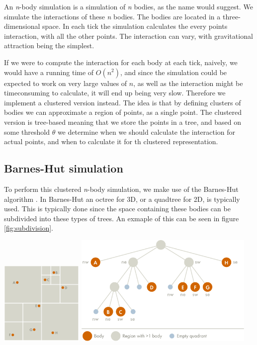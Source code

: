 An \textit{n}-body simulation is a simulation of \textit{n} bodies, as the name
would suggest. We simulate the interactions of these \textit{n} bodies. The
bodies are located in a three-dimensional space. In each tick the simulation
calculates the every points interaction, with all the other points. The
interaction can vary, with gravitational attraction being the simplest.

If we were to compute the interaction for each body at
each tick, naively, we would have a running time of $O(n^2)$, and since the
simulation could be expected to work on very large values of $n$, as well as the
interaction
might be timeconsuming to calculate, it will end up being very slow. Therefore we
implement a clustered version instead. The idea is that by defining clusters of
bodies we can approximate a region of points, as a single point. The clustered
version is tree-based meaning that we store the points in a tree, and based on
some threshold $\theta$ we determine when we should calculate the interaction
for actual points, and when to calculate it for th clustered representation.
\subsection{Barnes-Hut simulation}
To perform this clustered \textit{n}-body simulation, we make use of the
Barnes-Hut algorithm \cite{BH-algo}. In Barnes-Hut an octree for 3D, or a
quadtree for 2D, is typically used. This is typically done since the space
containing these bodies can be subdivided into these types of trees. An exmaple
of this can be seen in figure \ref{fig:subdivision}.
\begin{Figure}
  \centering
  \includegraphics[width=0.30\textwidth]{assests/example-space}
  \includegraphics[width=0.65\textwidth]{assests/example-tree}
  \label{fig:subdivision}
\end{Figure}
